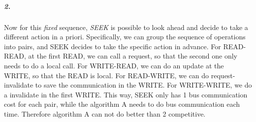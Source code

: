 \documentclass[12pt]{article}
\begin{document}
\subparagraph{2. } Now for this \emph{fixed} sequence, \emph{SEEK} is possible to look ahead and decide to take a different action in a priori. Specifically, we can group the sequence of operations into pairs, and SEEK decides to take the specific action in advance. For READ-READ, at the first READ, we can call a request, so that the second one only needs to do a local call. For WRITE-READ, we can do an update at the WRITE, so that the READ is local. For READ-WRITE, we can do request-invalidate to save the communication in the WRITE. For WRITE-WRITE, we do a invalidate in the first WRITE. This way, SEEK only has 1 bus communication cost for each pair, while the algorithm A needs to do bus communication each time. Therefore algorithm A can not do better than 2 competitive. 
\end{document}
